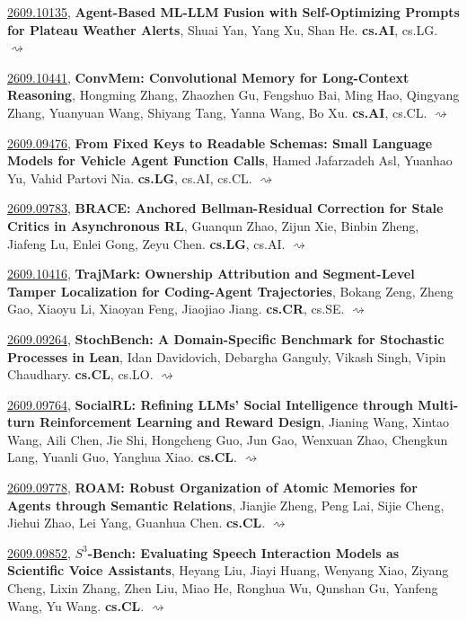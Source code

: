 \documentclass[9pt, a4paper]{article}
\theoremstyle{plain}
\theoremstyle{definition}
\theoremstyle{remark}
\newcommand{\arxiv}[3]{\href{https://arxiv.org/abs/#1}{#1}, \textbf{\textcolor{arxivblue}{#2}}, #3. }
\begin{document}
\arxiv{2609.10135}{Agent-Based ML-LLM Fusion with Self-Optimizing Prompts for Plateau Weather Alerts}{Shuai Yan, Yang Xu, Shan He}\textbf{cs.AI}, cs.LG. \hyperlink{2609.10135}{$\rightsquigarrow$}

\arxiv{2609.10441}{ConvMem: Convolutional Memory for Long-Context Reasoning}{Hongming Zhang, Zhaozhen Gu, Fengshuo Bai, Ming Hao, Qingyang Zhang, Yuanyuan Wang, Shiyang Tang, Yanna Wang, Bo Xu}\textbf{cs.AI}, cs.CL. \hyperlink{2609.10441}{$\rightsquigarrow$}

\arxiv{2609.09476}{From Fixed Keys to Readable Schemas: Small Language Models for Vehicle Agent Function Calls}{Hamed Jafarzadeh Asl, Yuanhao Yu, Vahid Partovi Nia}\textbf{cs.LG}, cs.AI, cs.CL. \hyperlink{2609.09476}{$\rightsquigarrow$}

\arxiv{2609.09783}{BRACE: Anchored Bellman-Residual Correction for Stale Critics in Asynchronous RL}{Guanqun Zhao, Zijun Xie, Binbin Zheng, Jiafeng Lu, Enlei Gong, Zeyu Chen}\textbf{cs.LG}, cs.AI. \hyperlink{2609.09783}{$\rightsquigarrow$}

\arxiv{2609.10416}{TrajMark: Ownership Attribution and Segment-Level Tamper Localization for Coding-Agent Trajectories}{Bokang Zeng, Zheng Gao, Xiaoyu Li, Xiaoyan Feng, Jiaojiao Jiang}\textbf{cs.CR}, cs.SE. \hyperlink{2609.10416}{$\rightsquigarrow$}

\arxiv{2609.09264}{StochBench: A Domain-Specific Benchmark for Stochastic Processes in Lean}{Idan Davidovich, Debargha Ganguly, Vikash Singh, Vipin Chaudhary}\textbf{cs.CL}, cs.LO. \hyperlink{2609.09264}{$\rightsquigarrow$}

\arxiv{2609.09764}{SocialRL: Refining LLMs' Social Intelligence through Multi-turn Reinforcement Learning and Reward Design}{Jianing Wang, Xintao Wang, Aili Chen, Jie Shi, Hongcheng Guo, Jun Gao, Wenxuan Zhao, Chengkun Lang, Yuanli Guo, Yanghua Xiao}\textbf{cs.CL}. \hyperlink{2609.09764}{$\rightsquigarrow$}

\arxiv{2609.09778}{ROAM: Robust Organization of Atomic Memories for Agents through Semantic Relations}{Jianjie Zheng, Peng Lai, Sijie Cheng, Jiehui Zhao, Lei Yang, Guanhua Chen}\textbf{cs.CL}. \hyperlink{2609.09778}{$\rightsquigarrow$}

\arxiv{2609.09852}{$S^3$-Bench: Evaluating Speech Interaction Models as Scientific Voice Assistants}{Heyang Liu, Jiayi Huang, Wenyang Xiao, Ziyang Cheng, Lixin Zhang, Zhen Liu, Miao He, Ronghua Wu, Qunshan Gu, Yanfeng Wang, Yu Wang}\textbf{cs.CL}. \hyperlink{2609.09852}{$\rightsquigarrow$}
\end{document}
